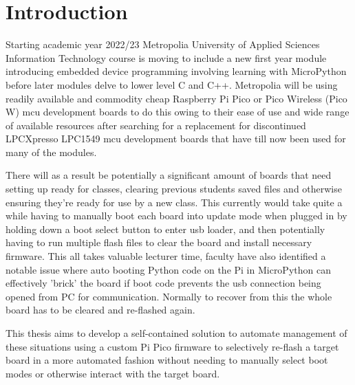 
\chapter{Introduction}

Starting academic year 2022/23 Metropolia University of Applied Sciences Information Technology course is moving to include a new first year module introducing embedded device programming involving learning with MicroPython before later modules delve to lower level C and C++. Metropolia will be using readily available and commodity cheap Raspberry Pi Pico or Pico Wireless (Pico W) \gls{mcu} development boards to do this owing to their ease of use and wide range of available resources after searching for a replacement for discontinued LPCXpresso LPC1549 \gls{mcu} development boards that have till now been used for many of the modules.

There will as a result be potentially a significant amount of boards that need setting up ready for classes, clearing previous students saved files and otherwise ensuring they're ready for use by a new class. This currently would take quite a while having to manually boot each board into update mode when plugged in by holding down a boot select button to enter \gls{usb} loader, and then potentially having to run multiple flash files to clear the board and install necessary firmware. This all takes valuable lecturer time, faculty have also identified a notable issue where auto booting Python code on the Pi in MicroPython can effectively 'brick' the board if boot code prevents the \gls{usb} connection being opened from PC for communication. Normally to recover from this the whole board has to be cleared and re-flashed again.

This thesis aims to develop a self-contained solution to automate management of these situations using a custom Pi Pico firmware to selectively re-flash a target board in a more automated fashion without needing to manually select boot modes or otherwise interact with the target board.